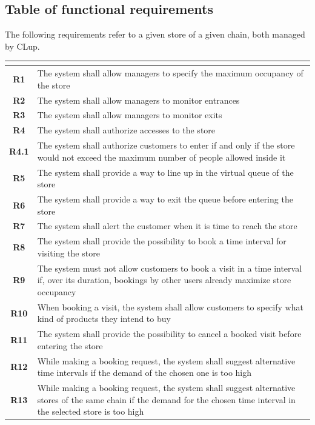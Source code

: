 \documentclass[a4paper,oneside,11pt]{book}   %
\begin{document}
    \subsection{Table of functional requirements}
    The following requirements refer to a given store of a given chain, both managed by CLup.
    \begin{longtable}[c]{|>{\bfseries{}}c|V{.65\textwidth}|}
        \hline
         \\
        \hline
        R1   & The system shall allow managers to specify the maximum occupancy of the store \\ \hline
        R2   & The system shall allow managers to monitor entrances \\ \hline
        R3   & The system shall allow managers to monitor exits \\ \hline
        R4   & The system shall authorize accesses to the store \\ \hline
        R4.1 & The system shall authorize customers to enter if and only if the store would not exceed the maximum number of people allowed inside it \\ \hline
        R5   & The system shall provide a way to line up in the virtual queue of the store \\ \hline
        R6   & The system shall provide a way to exit the queue before entering the store \\ \hline
        R7   & The system shall alert the customer when it is time to reach the store \\ \hline
        R8   & The system shall provide the possibility to book a time interval for visiting the store \\ \hline
        R9   & The system must not allow customers to book a visit in a time interval if, over its duration, bookings by other users already maximize store occupancy \\ \hline
        R10  & When booking a visit, the system shall allow customers to specify what kind of products they intend to buy \\ \hline
        R11  & The system shall provide the possibility to cancel a booked visit before entering the store \\ \hline
        R12  & While making a booking request, the system shall suggest alternative time intervals if the demand of the chosen one is too high \\ \hline
        R13  & While making a booking request, the system shall suggest alternative stores of the same chain if the demand for the chosen time interval in the selected store is too high \\ \hline

\end{longtable}
\end{document}
